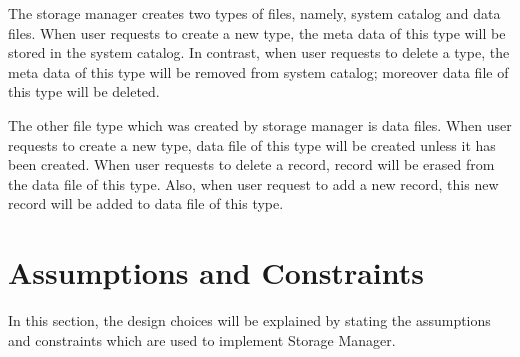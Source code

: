 \documentclass[12pt]{article}
\begin{document}
The storage manager creates two types of files, namely, system catalog and data files. When user requests to create a new type, the meta data of this type will be stored in the system catalog. In contrast, when user requests to delete a type, the meta data of this type will be removed from system catalog; moreover data file of this type will be deleted. 

The other file type which was created by storage manager is data files. When user requests to create a new type, data file of this type will be created unless it has been created. When user requests to delete a record, record will be erased from the data file of this type. Also, when user request to add a new record, this new record will be added to data file of this type. 


\section{Assumptions and Constraints}
In this section, the design choices will be explained by stating the assumptions and constraints which are used to implement Storage Manager. 
\end{document}
